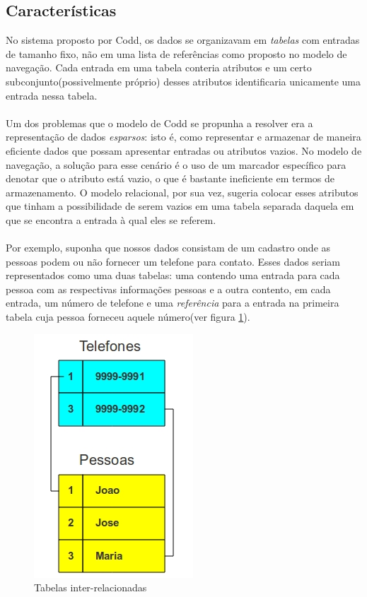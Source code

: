 \subsection{Características}
	No sistema proposto por Codd, os dados se organizavam em \textit{tabelas} com entradas de tamanho fixo, não em uma lista de referências como proposto no modelo de navegação. Cada entrada em uma tabela conteria atributos e um certo subconjunto(possivelmente próprio) desses atributos identificaria unicamente uma entrada nessa tabela.\\\\
	Um dos problemas que o modelo de Codd se propunha a resolver era a representação de dados \textit{esparsos}: isto é, como representar e armazenar de maneira eficiente dados que possam apresentar entradas ou atributos vazios. No modelo de navegação, a solução para esse cenário é o uso de um marcador específico para denotar que o atributo está vazio, o que é bastante ineficiente em termos de armazenamento. O modelo relacional, por sua vez, sugeria colocar esses atributos que tinham a possibilidade de serem vazios em uma tabela separada daquela em que se encontra a entrada à qual eles se referem. \\\\
	Por exemplo, suponha que nossos dados consistam de um cadastro onde as pessoas podem ou não fornecer um telefone para contato. Esses dados seriam representados como uma duas tabelas: uma contendo uma entrada para cada pessoa com as respectivas informações pessoas e a outra contento, em cada entrada, um número de telefone e uma \textit{referência} para a entrada na primeira tabela cuja pessoa forneceu aquele número(ver figura \ref{fig:tabelarelacao}).
\begin{figure}[h]
    \includegraphics[scale=0.50]{figuras/relacional1.jpg}
    \caption{Tabelas inter-relacionadas}
    \label{fig:tabelarelacao}
\end{figure}
